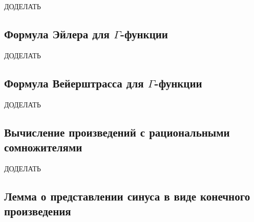 ДОДЕЛАТЬ

\subsection{Формула Эйлера для \(\Gamma\)-функции}

ДОДЕЛАТЬ

\subsection{Формула Вейерштрасса для \(\Gamma\)-функции}

ДОДЕЛАТЬ

\subsection{Вычисление произведений с рациональными сомножителями}

ДОДЕЛАТЬ

\subsection{Лемма о представлении синуса в виде конечного произведения}

